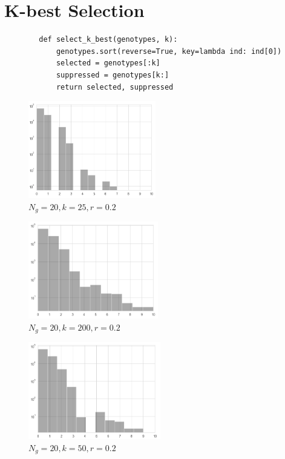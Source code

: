 \documentclass{article}
\begin{document}
		\section{K-best Selection}
		\begin{lstlisting}
		def select_k_best(genotypes, k):
			genotypes.sort(reverse=True, key=lambda ind: ind[0])
			selected = genotypes[:k]
			suppressed = genotypes[k:]
			return selected, suppressed
		\end{lstlisting}
		\begin{multicols}{2}
		\begin{figure}[H]
			\center
			\includegraphics[width=\linewidth, height=120pt]{data/population_Ng20_k25.png}
			\caption{\(N_g=20, k=25, r=0.2\)}
	  		\label{fig:popNg20k25}
  		\end{figure}
  		\begin{figure}[H]
			\center
			\includegraphics[width=\linewidth, height=120pt]{data/population_Ng20_k200.png}
			\caption{\(N_g=20, k=200, r=0.2\)}
	  		\label{fig:popNg20k200}
  		\end{figure}
  		\begin{figure}[H]
			\center
			\includegraphics[width=\linewidth, height=120pt]{data/population_Ng20_k50.png}
			\caption{\(N_g=20, k=50, r=0.2\)}

\end{figure}
\end{multicols}
\end{document}

